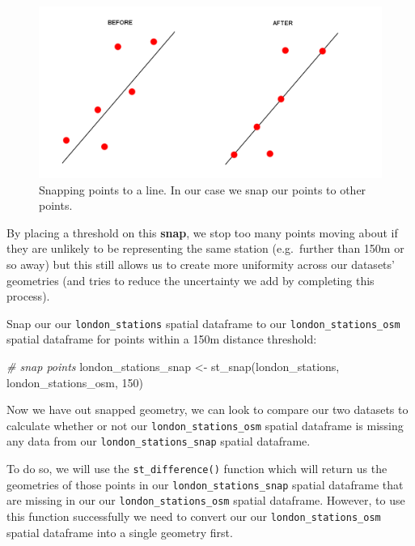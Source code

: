 \documentclass[
]{book}
\newenvironment{Shaded}{\begin{snugshade}}{\end{snugshade}}
\newcommand{\CommentTok}[1]{\textcolor[rgb]{0.56,0.35,0.01}{\textit{#1}}}
\newcommand{\DecValTok}[1]{\textcolor[rgb]{0.00,0.00,0.81}{#1}}
\newcommand{\FunctionTok}[1]{\textcolor[rgb]{0.00,0.00,0.00}{#1}}
\newcommand{\NormalTok}[1]{#1}
\newcommand{\OtherTok}[1]{\textcolor[rgb]{0.56,0.35,0.01}{#1}}
\begin{document}
\begin{figure}

{\centering \includegraphics[width=14.22in]{images/w06/snap1} 

}

\caption{Snapping points to a line. In our case we snap our points to other points.}\label{fig:06-snap1}
\end{figure}

By placing a threshold on this \textbf{snap}, we stop too many points moving about if they are unlikely to be representing the same station (e.g.~further than 150m or so away) but this still allows us to create more uniformity across our datasets' geometries (and tries to reduce the uncertainty we add by completing this process).

Snap our our \texttt{london\_stations} spatial dataframe to our \texttt{london\_stations\_osm} spatial dataframe for points within a 150m distance threshold:

\begin{Shaded}
\begin{Highlighting}[]
\CommentTok{\# snap points}
\NormalTok{london\_stations\_snap }\OtherTok{\textless{}{-}} \FunctionTok{st\_snap}\NormalTok{(london\_stations, london\_stations\_osm, }\DecValTok{150}\NormalTok{)}
\end{Highlighting}
\end{Shaded}

Now we have out snapped geometry, we can look to compare our two datasets to calculate whether or not our \texttt{london\_stations\_osm} spatial dataframe is missing any data from our \texttt{london\_stations\_snap} spatial dataframe.

To do so, we will use the \texttt{st\_difference()} function which will return us the geometries of those points in our \texttt{london\_stations\_snap} spatial dataframe that are missing in our our \texttt{london\_stations\_osm} spatial dataframe. However, to use this function successfully we need to convert our our \texttt{london\_stations\_osm} spatial dataframe into a single geometry first.
\end{document}
